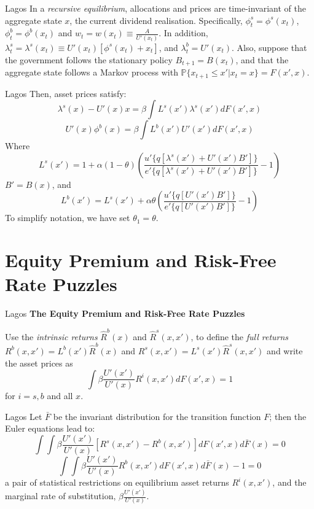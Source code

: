 \documentclass[aspectratio=169,xcolor=dvipsnames]{beamer}
\begin{document}
\begin{frame}{Lagos}
    In a \emph{recursive equilibrium}, allocations and prices are time-invariant of the aggregate state $x$, the current dividend realisation. Specifically, $\phi^s_t = \phi^s(x_t)$, $\phi^b_t = \phi^b(x_t)$ and $w_t = w(x_t) \equiv \frac{A}{U'(x_t)}$. In addition, $\lambda^s_t = \lambda^s(x_t) \equiv U'(x_t)[\phi^s(x_t) + x_t]$, and $\lambda^b_t = U'(x_t)$. Also, suppose that the government follows the stationary policy $B_{t+1} = B(x_t)$, and that the aggregate state follows a Markov process with $\mathbb{P}\{x_{t+1} \le x' | x_t = x\} = F(x', x)$.
\end{frame}

\begin{frame}{Lagos}
    Then, asset prices satisfy:
    \[
        \lambda^s(x) - U'(x) x = \beta \int L^s(x') \lambda^s(x') dF(x', x)
    \]
    \[
        U'(x) \phi^b(x) = \beta \int L^b(x') U'(x') dF(x', x)
    \]
    Where
    \[
        L^s(x') = 1 + \alpha(1 - \theta) \left( \frac{u'\{q[\lambda^s(x') + U'(x') B']\}}{e'\{q[\lambda^s(x') + U'(x') B']\}} - 1\right)
    \]
    $B' = B(x)$, and
    \[
        L^b(x') = L^s(x') + \alpha \theta \left( \frac{u'\{q[U'(x') B']\}}{e'\{q[U'(x') B']\}} - 1\right)
    \]
    To simplify notation, we have set $\theta_1 = \theta$.
\end{frame}

\section{Equity Premium and Risk-Free Rate Puzzles}

\begin{frame}{Lagos}
    \textbf{The Equity Premium and Risk-Free Rate Puzzles}

    Use the \emph{intrinsic returns} $\hat R^b(x)$ and $\hat R^s(x, x')$, to define the \emph{full returns} $R^b(x, x') = L^b(x') \hat R^b(x)$ and $R^s(x, x') = L^s(x') \hat R^s(x, x')$ and write the asset prices as
    \[
        \int \beta \frac{U'(x')}{U'(x)} R^i(x, x') dF(x', x) = 1
    \]
    for $i = s, b$ and all $x$.
\end{frame}

\begin{frame}{Lagos}
    Let $\bar F$ be the invariant distribution for the transition function $F$; then the Euler equations lead to:
    \[
        \int \int \beta \frac{U'(x')}{U'(x)}[R^s(x, x') - R^b(x, x')] dF(x', x) d\bar F(x) = 0
    \]
    \[
        \int \int \beta \frac{U'(x')}{U'(x)} R^b(x, x') dF(x', x) d\bar F(x) - 1 = 0
    \]
    a pair of statistical restrictions on equilibrium asset returns $R^i(x, x')$, and the marginal rate of substitution, $\beta \frac{U'(x')}{U'(x)}$.
\end{frame}
\end{document}
